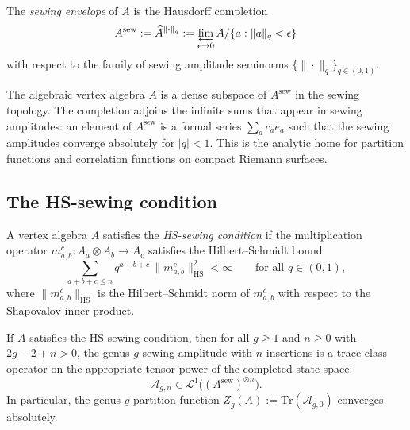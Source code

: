 \begin{definition}
The \emph{sewing envelope} of $A$ is the Hausdorff completion
\[
A^{\mathrm{sew}}
:=
\widehat{A}^{\|\cdot\|_q}
:=
\varprojlim_{\epsilon \to 0}
A / \{a : \|a\|_q < \epsilon\}
\]
with respect to the family of sewing amplitude seminorms $\{\|\cdot\|_q\}_{q \in (0,1)}$.
\end{definition}

\begin{remark}
The algebraic vertex algebra $A$ is a dense subspace of $A^{\mathrm{sew}}$
in the sewing topology. The completion adjoins the infinite sums that
appear in sewing amplitudes: an element of $A^{\mathrm{sew}}$ is a
formal series $\sum_a c_a e_a$ such that the sewing amplitudes converge
absolutely for $|q| < 1$. This is the analytic home for partition functions
and correlation functions on compact Riemann surfaces.
\end{remark}

\subsection{The HS-sewing condition}

\begin{definition}
A vertex algebra $A$ satisfies the \emph{HS-sewing condition} if
the multiplication operator $m_{a,b}^c : A_a \otimes A_b \to A_c$
satisfies the Hilbert--Schmidt bound
\[
\sum_{a+b+c \le n} q^{a+b+c}\, \|m_{a,b}^c\|_{\mathrm{HS}}^2
< \infty
\qquad\text{for all }q \in (0,1),
\]
where $\|m_{a,b}^c\|_{\mathrm{HS}}$ is the Hilbert--Schmidt norm of
$m_{a,b}^c$ with respect to the Shapovalov inner product.
\end{definition}

\begin{theorem}
If $A$ satisfies the HS-sewing condition, then for all $g \ge 1$
and $n \ge 0$ with $2g - 2 + n > 0$, the genus-$g$ sewing amplitude
with $n$ insertions is a trace-class operator on the appropriate
tensor power of the completed state space:
\[
\mathcal{A}_{g,n} \in \mathcal{L}^1\bigl(
(A^{\mathrm{sew}})^{\otimes n}\bigr).
\]
In particular, the genus-$g$ partition function
$Z_g(A) := \mathrm{Tr}(\mathcal{A}_{g,0})$ converges absolutely.
\end{theorem}

